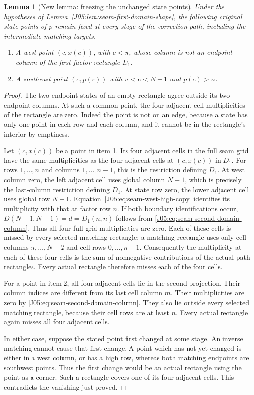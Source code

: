 \documentclass[11pt,oneside]{report}
\newtheorem{lemma}[theorem]{Lemma}
\theoremstyle{definition}
\numberwithin{equation}{section}
\begin{document}
\begin{lemma}[New lemma: freezing the unchanged state points]
\label{J05:lem:seam-first-frozen-points}
Under the hypotheses of Lemma~\ref{J05:lem:seam-first-domain-shape},
the following original state points of $p$ remain fixed at every
stage of the correction path, including the intermediate matching
targets.
\begin{enumerate}
\item A west point $(c,x(c))$, with $c<n$, whose column is not an
endpoint column of the first-factor rectangle $D_1$.
\item A southeast point $(c,p(c))$ with $n<c<N-1$ and $p(c)>n$.
\end{enumerate}
\end{lemma}
\begin{proof}
The two endpoint states of an empty rectangle agree outside its two
endpoint columns. At such a common point, the four adjacent cell
multiplicities of the rectangle are zero. Indeed the point is not
on an edge, because a state has only one point in each row and each
column, and it cannot be in the rectangle's interior by emptiness.

Let $(c,x(c))$ be a point in item 1. Its four adjacent cells in the
full seam grid have the same multiplicities as the four adjacent
cells at $(c,x(c))$ in $D_1$.
For rows $1,\ldots,n$ and columns $1,\ldots,n-1$, this is the
restriction defining $D_1$. At west column zero, the left adjacent
cell uses global column $N-1$, which is precisely the last-column
restriction defining $D_1$.
At state row zero, the lower adjacent cell uses global row $N-1$.
Equation~\eqref{J05:eq:seam-west-high-copy} identifies its multiplicity
with that at factor row $n$. If both boundary identifications occur,
$D(N-1,N-1)=d=D_1(n,n)$ follows from
\eqref{J05:eq:seam-second-domain-column}.
Thus all four full-grid multiplicities are zero.
Each of these cells is missed by every selected matching rectangle:
a matching rectangle uses only cell columns $n,\ldots,N-2$ and
cell rows $0,\ldots,n-1$.
Consequently the multiplicity at each of these four cells is the
sum of nonnegative contributions of the actual path rectangles.
Every actual rectangle therefore misses each of the four cells.

For a point in item 2, all four adjacent cells lie in the second
projection. Their column indices are different from its last cell
column $m$. Their multiplicities are zero by
\eqref{J05:eq:seam-second-domain-column}. They also lie outside every
selected matching rectangle, because their cell rows are at least
$n$. Every actual rectangle again misses all four adjacent cells.

In either case, suppose the stated point first changed at some stage.
An inverse matching cannot cause that first change. A point which has
not yet changed is either in a west column, or has a high row, whereas
both matching endpoints are southwest points.
Thus the first change would be an actual rectangle using the point
as a corner. Such a rectangle covers one of its four adjacent cells.
This contradicts the vanishing just proved.
\end{proof}
\end{document}
